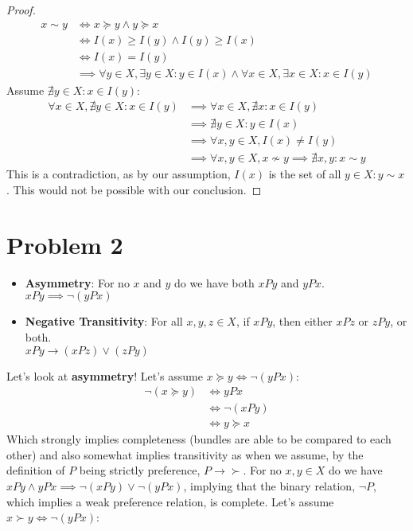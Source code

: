 \documentclass{article}
\begin{document}
\begin{itemize}
\begin{proof}
\begin{align}
    x\sim y &\Longleftrightarrow x\succeq y \land y \succeq x 
    \\&\Longleftrightarrow I(x)\geq I(y) \land I(y) \geq I(x)\\ &\Longleftrightarrow I(x)=I(y)\\ &\implies \forall y\in X, \exists y\in X: y\in I(x) \land  \forall x\in X, \exists x\in X: x\in I(y)
\end{align}
Assume $\nexists y \in X: x\in I(y)$:
\begin{align}
\forall x\in X, \nexists y \in X: x\in I(y) &\implies \forall x \in X, \nexists x: x\in I(y)\\ &\implies \nexists y \in X: y\in I(x)\\ &\implies \forall x, y\in X,  I(x) \neq I(y) \\ &\implies \forall x, y\in X, x\nsim y \implies \nexists x, y: x\sim y
\end{align}
This is a contradiction, as by our assumption, $I(x)$ is the set of all $y\in X: y\sim x$. This would not be possible with our conclusion. 
\end{proof}
\end{itemize}
\newpage
\section*{Problem 2}
\begin{itemize}
    \item \textbf{Asymmetry}:  For no $x$ and $y$ do we have both $xPy$ and $yPx$. \\$xPy\implies \neg(yPx)$
    \item \textbf{Negative Transitivity}: For all $x, y, z \in X$, if $xPy$, then either $xPz$ or $zPy$, or both. \\$xPy\rightarrow (xPz) \lor (zPy)$
\end{itemize}
Let's look at \textbf{asymmetry}! Let's assume $x\succeq y \Longleftrightarrow \neg (yPx)$:
\begin{align}
    \neg(x \succeq y) & \Longleftrightarrow yPx\\ &\Longleftrightarrow \neg(x P y) \\ &\Longleftrightarrow y \succeq x 
\end{align}
Which strongly implies completeness (bundles are able to be compared to each other) and also somewhat implies transitivity as when we assume, by the definition of $P$ being strictly preference, $P\rightarrow\succ$. For no $x, y \in X$ do we have $xPy\land yPx\implies \neg (xPy) \lor \neg (yPx)$, implying that the binary relation, $\neg P$, which implies a weak preference relation, is complete.  Let's assume $x\succ y \Longleftrightarrow \neg (yPx)$:
\end{document}
